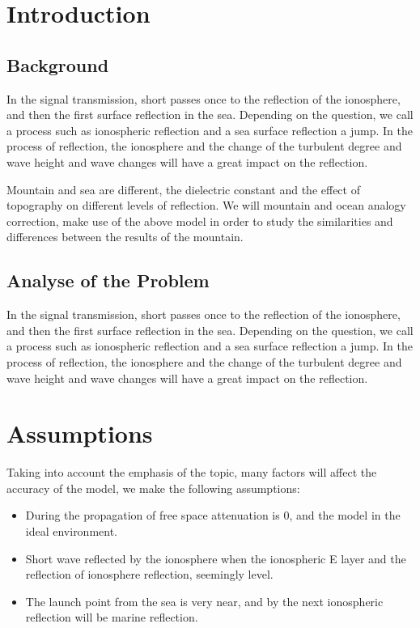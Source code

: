 \documentclass{mcmthesis}
\begin{document}
\newpage

\pagestyle{fancy}

\section{Introduction}
\subsection{Background}

In the signal transmission, short passes once to the reflection of the ionosphere, and then the first surface reflection in the sea. Depending on the question, we call a process such as ionospheric reflection and a sea surface reflection a jump. In the process of reflection, the ionosphere and the change of the turbulent degree and wave height and wave changes will have a great impact on the reflection. 

Mountain and sea are different, the dielectric constant and the effect of topography on different levels of reflection. We will mountain and ocean analogy correction, make use of the above model in order to study the similarities and differences between the results of the mountain.

\subsection{Analyse of the Problem}

In the signal transmission, short passes once to the reflection of the ionosphere, and then the first surface reflection in the sea. Depending on the question, we call a process such as ionospheric reflection and a sea surface reflection a jump. In the process of reflection, the ionosphere and the change of the turbulent degree and wave height and wave changes will have a great impact on the reflection.


\section{Assumptions}
Taking into account the emphasis of the topic, many factors will affect the accuracy of the model, we make the following assumptions:

\begin{itemize}
\item During the propagation of free space attenuation is 0, and the model in the ideal environment.
\item Short wave reflected by the ionosphere when the ionospheric E layer and the reflection of ionosphere reflection, seemingly level.
\item The launch point from the sea is very near, and by the next ionospheric reflection will be marine reflection.
\end{itemize}
\end{document}
